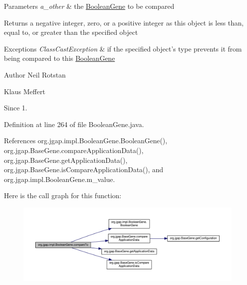 \begin{DoxyParams}{Parameters}
{\em a\-\_\-other} & the \hyperlink{classorg_1_1jgap_1_1impl_1_1_boolean_gene}{Boolean\-Gene} to be compared \\
\hline
\end{DoxyParams}
\begin{DoxyReturn}{Returns}
a negative integer, zero, or a positive integer as this object is less than, equal to, or greater than the specified object
\end{DoxyReturn}

\begin{DoxyExceptions}{Exceptions}
{\em Class\-Cast\-Exception} & if the specified object's type prevents it from being compared to this \hyperlink{classorg_1_1jgap_1_1impl_1_1_boolean_gene}{Boolean\-Gene}\\
\hline
\end{DoxyExceptions}
\begin{DoxyAuthor}{Author}
Neil Rotstan 

Klaus Meffert 
\end{DoxyAuthor}
\begin{DoxySince}{Since}
1. 
\end{DoxySince}


Definition at line 264 of file Boolean\-Gene.\-java.



References org.\-jgap.\-impl.\-Boolean\-Gene.\-Boolean\-Gene(), org.\-jgap.\-Base\-Gene.\-compare\-Application\-Data(), org.\-jgap.\-Base\-Gene.\-get\-Application\-Data(), org.\-jgap.\-Base\-Gene.\-is\-Compare\-Application\-Data(), and org.\-jgap.\-impl.\-Boolean\-Gene.\-m\-\_\-value.



Here is the call graph for this function\-:
\nopagebreak
\begin{figure}[H]
\begin{center}
\leavevmode
\includegraphics[width=350pt]{classorg_1_1jgap_1_1impl_1_1_boolean_gene_a3d7f5c0543076d1b8090a17b7935aabd_cgraph}
\end{center}
\end{figure}


